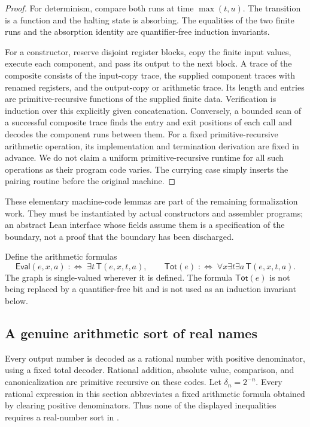 \begin{proof}
For determinism, compare both runs at time $\max(t,u)$. The transition is a
function and the halting state is absorbing. The equalities of the two finite
runs and the absorption identity are quantifier-free induction invariants.

For a constructor, reserve disjoint register blocks, copy the finite input
values, execute each component, and pass its output to the next block. A trace
of the composite consists of the input-copy trace, the supplied component
traces with renamed registers, and the output-copy or arithmetic trace. Its
length and entries are primitive-recursive functions of the supplied finite
data. Verification is induction over this explicitly given concatenation.
Conversely, a bounded scan of a successful composite trace finds the entry
and exit positions of each call and decodes the component runs between them.
For a fixed primitive-recursive arithmetic operation, its implementation and
termination derivation are fixed in advance. We do not claim a uniform
primitive-recursive runtime for all such operations as their program code
varies. The currying case simply inserts the pairing routine before the
original machine.
\end{proof}

These elementary machine-code lemmas are part of the remaining formalization
work. They must be instantiated by actual constructors and assembler programs;
an abstract Lean interface whose fields assume them is a specification of the
boundary, not a proof that the boundary has been discharged.

Define the arithmetic formulas
\[
 \mathsf{Eval}(e,x,a)\;:\!\!\iff\;\exists t\,\mathsf T(e,x,t,a),
 \qquad
 \mathsf{Tot}(e)\;:\!\!\iff\;\forall x\exists t\exists a\,
       \mathsf T(e,x,t,a).
\]
The graph is single-valued wherever it is defined. The formula
$\mathsf{Tot}(e)$ is not being replaced by a quantifier-free bit and is not
used as an induction invariant below.

\subsection{A genuine arithmetic sort of real names}

Every output number is decoded as a rational number with positive denominator,
using a fixed total decoder. Rational addition, absolute value, comparison,
and canonicalization are primitive recursive on these codes. Let
$\delta_n=2^{-n}$. Every rational expression in this section abbreviates a
fixed arithmetic formula obtained by clearing positive denominators. Thus
none of the displayed inequalities requires a real-number sort in \ipra.

